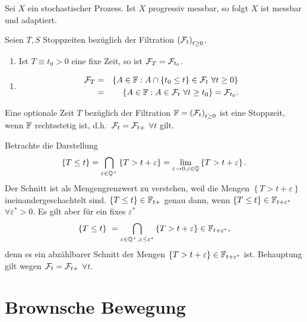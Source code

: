  Sei $X$ ein stochastischer Prozess. Ist $X$
progressiv messbar, so folgt $X$ ist messbar und adaptiert.


 Seien $T,S$ Stoppzeiten bezüglich der Filtration
$\left( \mathcal F_t \right)_{t \geq 0}$. 
\begin{enumerate}
    \item Ist $T \equiv t_0>0$ eine fixe Zeit, so ist $\mathcal F_T=\mathcal F_{t_0}$.
\end{enumerate}

\solution
\begin{enumerate}
    \item \begin{eqnarray}
            \mathcal F_T &=& 
            \left\{ A\in\mathbb F : A \cap \left\{ t_0 \leq t \right\}\in\mathcal F_t \ \forall t\geq 0 \right\} \\
            &=& \left\{ A\in\mathbb F : A\in\mathcal F_t \ \forall t\geq t_0 \right\} = \mathcal F_{t_0}.
        \end{eqnarray}
\end{enumerate}


 Eine optionale Zeit $T$ bezüglich
der Filtration $\mathbb F=\left( \mathcal F_t \right)_{t \geq 0}$ ist eine Stoppzeit, wenn 
$\mathbb F$ rechtsstetig ist, d.h.\ $\mathcal F_t=\mathcal F_{t+}$ $\forall t$ gilt.

\solution  Betrachte die Darstellung
\begin{eqnarray}
    \left\{ T \leq t \right\} = \bigcap_{\varepsilon\in\mathbb Q^{+}} \left\{ T > t+\varepsilon \right\}
    = \lim_{\varepsilon\to 0, \varepsilon\in\mathbb Q} \left\{ T > t+\varepsilon \right\}.
\end{eqnarray}
Der Schnitt ist als Mengengrenzwert zu verstehen, weil die Mengen $\left\{ T >
t+\varepsilon \right\}$ ineinandergeschachtelt sind. $\left\{ T \leq t \right\}\in \mathbb F_{t+}$
genau dann, wenn $\left\{ T \leq t \right\}\in \mathbb F_{t+\varepsilon^{*}}$ $\forall \varepsilon^{*}>0$.
Es gilt aber für ein fixes $\varepsilon^{*}$
\begin{equation}
    \left\{ T \leq t \right\}\ = 
    \bigcap_{\varepsilon\in\mathbb Q^{+}, \varepsilon\leq \varepsilon^{*}} \left\{ T > t+\varepsilon \right\} 
    \in\mathbb F_{t+\varepsilon^{*}},
\end{equation}
denn es ein abzählbarer Schnitt der Mengen $\left\{ T> t+\varepsilon
\right\}\in\mathbb F_{t+\varepsilon^{*}}$ ist. Behauptung gilt wegen $\mathcal F_t=\mathcal F_{t+}$ $\forall t$.


\section{Brownsche Bewegung}

